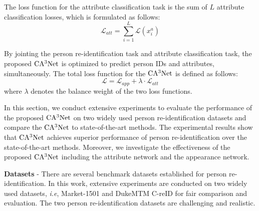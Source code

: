 \documentclass[sigconf]{acmart}
\begin{document}
The loss function for the attribute classification task is the sum of $L$ attribute classification losses, which is formulated as follows:
\begin{equation}
\mathcal{L}_{att}=\sum\limits_{i=1}^{L}\mathcal{L}(x_i^a)
\end{equation}

By jointing the person re-identification task and attribute classification task, the proposed $\rm CA^3Net$ is optimized to predict person IDs and attributes, simultaneously. The total loss function for the $\rm CA^3Net$ is defined as follows:
\begin{equation}
\mathcal{L} = \mathcal{L}_{app} + \lambda\cdot \mathcal{L}_{att}
\end{equation}
where $\lambda$ denotes the balance weight of the two loss functions.

In this section, we conduct extensive experiments to evaluate the performance of the proposed $\rm CA^3Net$ on two widely used person re-identification datasets and compare the $\rm CA^3Net$ to state-of-the-art methods. The experimental results show that $\rm CA^3Net$ achieves superior performance of person re-identification over the state-of-the-art methods. Moreover, we investigate the effectiveness of the proposed $\rm CA^3Net$ including the attribute network and the appearance network.

\textbf{Datasets} - There are several benchmark datasets established for person re-identification. In this work, extensive experiments are conducted on two widely used datasets, \textit{i.e}, Market-1501 and DukeMTM
C-reID for fair comparison and evaluation. The two person re-identification datasets are challenging and realistic.
\end{document}

